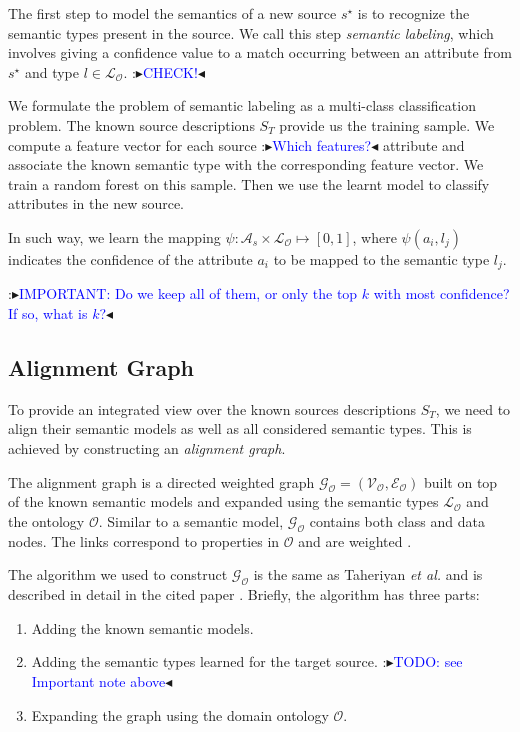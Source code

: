 \documentclass[letterpaper]{article} %
\newcommand{\authornote}[3]{
  {\fbox{\sc 
  #1}:$\blacktriangleright$\textcolor{#2}{\small{#3}}$\blacktriangleleft$}%
}
\newcommand{\ddg}[1]{\authornote{DDG}{blue}{#1}}
\newcommand{\etal}{\textit{et al.}}
\begin{document}
The first step to model the semantics of a new source $s^\star$ is to recognize 
the semantic types present in the source. 
We call this step \emph{semantic labeling}, which involves giving a confidence 
value to a match occurring between an attribute from $s^\star$ and type $l \in 
\mathcal{L_O}$. \ddg{CHECK!}

We formulate the problem of semantic labeling as a multi-class classification
problem. The known source descriptions $S_T$ provide us the training sample. We
compute a feature vector for each source \ddg{Which features?} attribute and 
associate the known
semantic type with the corresponding feature vector. We train a random forest
on this sample. Then we use the learnt model to classify attributes in the new
source.

In such way, we learn the mapping $\psi : \mathcal{A}_s \times \mathcal{L_O} 
\mapsto [0, 1]$,
where $\psi(a_i,l_j)$ indicates the confidence of the attribute $a_i$ to be 
mapped to the semantic type $l_j$.

\ddg{IMPORTANT: Do we keep all of them, or only the top $k$ with most 
confidence? If so, 
what is $k$?}



\subsection{Alignment Graph}

To provide an integrated view over the known sources descriptions $S_T$, we 
need to align their semantic models as well as all considered semantic 
types. This is achieved by constructing an \emph{alignment graph}. 

The alignment graph is a directed weighted graph $\mathcal{G_O} = 
(\mathcal{V_O},\mathcal{E_O})$ built on top 
of the known semantic models and expanded using the semantic types 
$\mathcal{L_O}$ and the ontology $\mathcal{O}$. Similar to a semantic 
model, $\mathcal{G_O}$ contains both class and data nodes. The links correspond 
to properties in  $\mathcal{O}$ and are weighted \cite{taheriyan2016learning}.

The algorithm we used to construct $\mathcal{G_O}$ is the same as Taheriyan 
\etal{} and is described in detail in the cited paper 
\cite{taheriyan2016learning}.
Briefly, the algorithm has three parts:
\begin{enumerate}
\item Adding the known semantic models.
\item Adding the semantic types learned for the target source. \ddg{TODO: see 
Important note above}
\item Expanding the graph using the domain ontology $\mathcal{O}$.
\end{enumerate}
\end{document}
